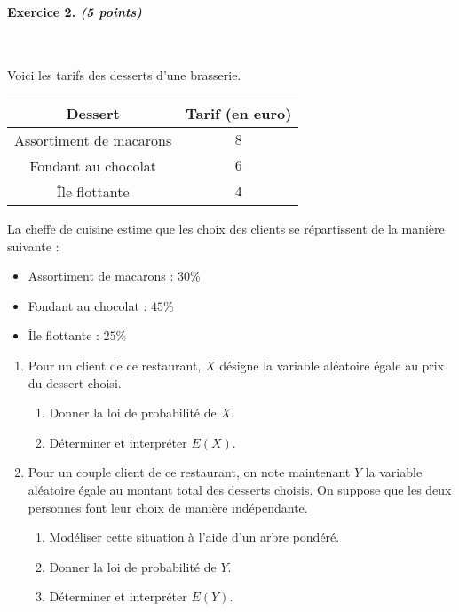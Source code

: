 \documentclass[11pt]{article}
\begin{document}
\paragraph{Exercice 2. \emph{(5 points)}}~\\
\begin{minipage}[t]{.5\textwidth}
Voici les tarifs des desserts d'une brasserie.
\begin{center}
\renewcommand{\arraystretch}{1.5}
\begin{tabular}{cc}
  \toprule
  \textbf{Dessert} & \textbf{Tarif (en euro)} \\ \midrule
  Assortiment de macarons & $8$ \\
  Fondant au chocolat & $6$ \\
  Île flottante & $4$ \\ \bottomrule
\end{tabular}
\end{center}
\end{minipage}
\begin{minipage}[t]{.5\textwidth}
La cheffe de cuisine estime que les choix des clients se répartissent de la
manière suivante :
\begin{itemize}
  \item Assortiment de macarons : $30$\%
  \item Fondant au chocolat : $45$\%
  \item Île flottante : $25$\%
\end{itemize}
\end{minipage}
\begin{enumerate}
  \item Pour un client de ce restaurant, $X$ désigne la variable aléatoire égale
    au prix du dessert choisi.
    \begin{enumerate}
      \item Donner la loi de probabilité de $X$.
      \item Déterminer et interpréter $E(X)$.
    \end{enumerate}
  \item Pour un couple client de ce restaurant, on note maintenant $Y$ la
    variable aléatoire égale au montant total des desserts choisis. On suppose
    que les deux personnes font leur choix de manière indépendante.
    \begin{enumerate}
      \item Modéliser cette situation à l'aide d'un arbre pondéré.
      \item Donner la loi de probabilité de $Y$.
      \item Déterminer et interpréter $E(Y)$.
    \end{enumerate}
\end{enumerate}
\end{document}
